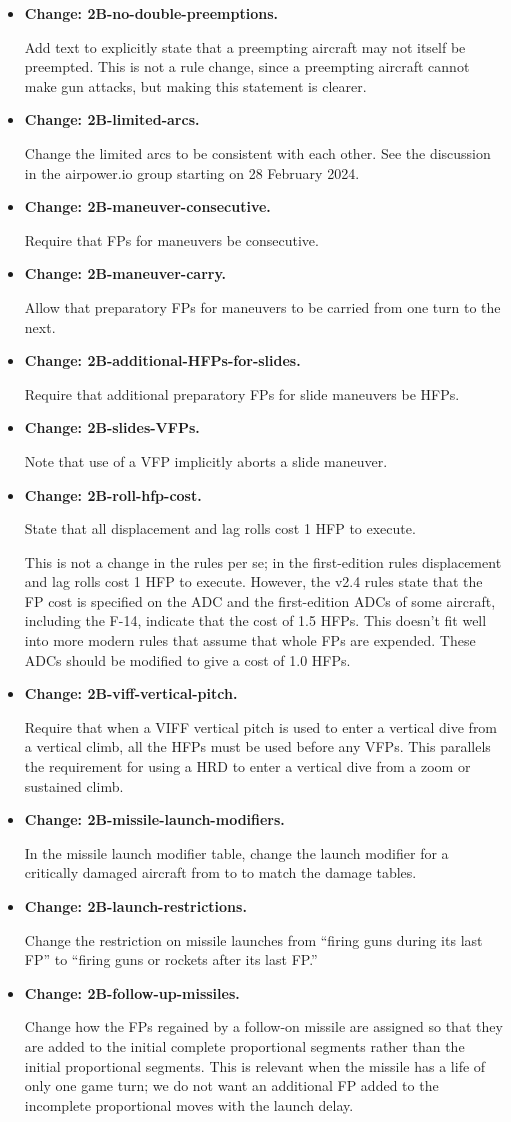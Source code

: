 \documentclass[10pt]{report}
\newcommand{\itemtag}[1]{\item \textbf{Change: #1.}\par}
\begin{document}
\begin{itemize}
    \itemtag{2B-no-double-preemptions} Add text to explicitly state that a preempting aircraft may not itself be preempted. This is not a rule change, since a preempting aircraft cannot make gun attacks, but making this statement is clearer.

    \itemtag{2B-limited-arcs} Change the limited arcs to be consistent with each other. See the discussion in the airpower.io group starting on 28 February 2024.

    \itemtag{2B-maneuver-consecutive} Require that FPs for maneuvers be consecutive.

    \itemtag{2B-maneuver-carry} Allow that preparatory FPs for maneuvers to be carried from one turn to the next.
    
    \itemtag{2B-additional-HFPs-for-slides} Require that additional preparatory FPs for slide maneuvers be HFPs.
    
    \itemtag{2B-slides-VFPs} Note that use of a VFP implicitly aborts a slide maneuver.

    \itemtag{2B-roll-hfp-cost} State that all displacement and lag rolls cost 1 HFP to execute.

    This is not a change in the rules per se; in the first-edition rules displacement and lag rolls cost 1 HFP to execute. However, the v2.4 rules state that the FP cost is specified on the ADC and the first-edition ADCs of some aircraft, including the F-14, indicate that the cost of 1.5 HFPs. This doesn't fit well into more modern rules that assume that whole FPs are expended. These ADCs should be modified to give a cost of 1.0 HFPs.
    
    \itemtag{2B-viff-vertical-pitch} Require that when a VIFF vertical pitch is used to enter a vertical dive from a vertical climb, all the HFPs must be used before any VFPs. This parallels the requirement for using a HRD to enter a vertical dive from a zoom or sustained climb.

    \itemtag{2B-missile-launch-modifiers} In the missile launch modifier table, change the launch modifier for a critically damaged aircraft from  to  to match the damage tables.
    
    \itemtag{2B-launch-restrictions} Change the restriction on missile launches from “firing guns during its last FP” to “firing guns or rockets after its last FP.”

    \itemtag{2B-follow-up-missiles} Change how the FPs regained by a follow-on missile are assigned so that they are added to the initial complete proportional segments rather than the initial proportional segments. This is relevant when the missile has a life of only one game turn; we do not want an additional FP added to the incomplete proportional moves with the launch delay.
    

\end{itemize}
\end{document}
